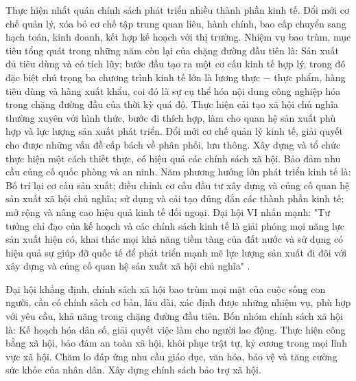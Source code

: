 Thực hiện nhất quán chính sách phát triển nhiều thành phần kinh tế. Đổi mới cơ chế quản lý, xóa bỏ cơ chế tập trung quan liêu, hành chính, bao cấp chuyển sang hạch toán, kinh doanh, kết hợp kế hoạch với thị trường. Nhiệm vụ bao trùm, mục tiêu tổng quát trong những năm còn lại của chặng đường đầu tiên là: Sản xuất đủ tiêu dùng và có tích lũy; bước đầu tạo ra một cơ cấu kinh tế hợp lý, trong đó đặc biệt chú trọng ba chương trình kinh tế lớn là lương thực $-$ thực phẩm, hàng tiêu dùng và hàng xuất khẩu, coi đó là sự cụ thể hóa nội dung công nghiệp hóa trong chặng đường đầu của thời kỳ quá độ. Thực hiện cải tạo xã hội chủ nghĩa thường xuyên với hình thức, bước đi thích hợp, làm cho quan hệ sản xuất phù hợp và lực lượng sản xuất phát triển. Đổi mới cơ chế quản lý kinh tế, giải quyết cho được những vấn đề cấp bách về phân phối, lưu thông. Xây dựng và tổ chức thực hiện một cách thiết thực, có hiệu quả các chính sách xã hội. Bảo đảm nhu cầu củng cố quốc phòng và an ninh. Năm phương hướng lớn phát triển kinh tế là: Bố trí lại cơ cấu sản xuất; điều chỉnh cơ cấu đầu tư xây dựng và củng cố quan hệ sản xuất xã hội chủ nghĩa; sử dụng và cải tạo đúng đắn các thành phần kinh tế; mở rộng và nâng cao hiệu quả kinh tế đối ngoại. Đại hội VI nhấn mạnh: "Tư tưởng chỉ đạo của kế hoạch và các chính sách kinh tế là giải phóng mọi năng lực sản xuất hiện có, khai thác mọi khả năng tiềm tàng của đất nước và sử dụng có hiệu quả sự giúp đỡ quốc tế để phát triển mạnh mẽ lực lượng sản xuất đi đôi với xây dựng và củng cố quan hệ sản xuất xã hội chủ nghĩa" .

Đại hội khẳng định, chính sách xã hội bao trùm mọi mặt của cuộc sống con người, cần có chính sách cơ bản, lâu dài, xác định được những nhiệm vụ, phù hợp với yêu cầu, khả năng trong chặng đường đầu tiên. Bốn nhóm chính sách xã hội là: Kế hoạch hóa dân số, giải quyết việc làm cho người lao động. Thực hiện công bằng xã hội, bảo đảm an toàn xã hội, khôi phục trật tự, kỷ cương trong mọi lĩnh vực xã hội. Chăm lo đáp ứng nhu cầu giáo dục, văn hóa, bảo vệ và tăng cường sức khỏe của nhân dân. Xây dựng chính sách bảo trợ xã hội.